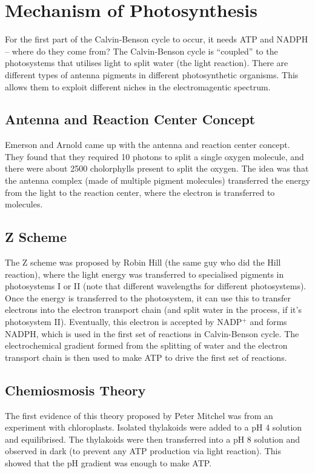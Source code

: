 \section{Mechanism of Photosynthesis}

For the first part of the Calvin-Benson cycle to occur, it needs ATP and NADPH -- where do they come from?
The Calvin-Benson cycle is ``coupled'' to the photosystems that utilises light to split water (the light reaction).
There are different types of antenna pigments in different photosynthetic organisms.
This allows them to exploit different niches in the electromagentic spectrum.

\subsection{Antenna and Reaction Center Concept}

Emerson and Arnold came up with the antenna and reaction center concept.
They found that they required 10 photons to split a single oxygen molecule, and there were about 2500 cholorphylls present to split the oxygen.
The idea was that the antenna complex (made of multiple pigment molecules) transferred the energy from the light to the reaction center, where the electron is transferred to molecules.

\subsection{Z Scheme}

The Z scheme was proposed by Robin Hill (the same guy who did the Hill reaction), where the light energy was transferred to specialised pigments in photosystems I or II (note that different wavelengths for different photosystems).
Once the energy is transferred to the photosystem, it can use this to transfer electrons into the electron transport chain (and split water in the process, if it's photosystem II).
Eventually, this electron is accepted by NADP$^+$ and forms NADPH, which is used in the first set of reactions in Calvin-Benson cycle.
The electrochemical gradient formed from the splitting of water and the electron transport chain is then used to make ATP to drive the first set of reactions.

\subsection{Chemiosmosis Theory}

The first evidence of this theory proposed by Peter Mitchel was from an experiment with chloroplasts.
Isolated thylakoids were added to a pH 4 solution and equilibrised.
The thylakoids were then transferred into a pH 8 solution and observed in dark (to prevent any ATP production via light reaction).
This showed that the pH gradient was enough to make ATP.

